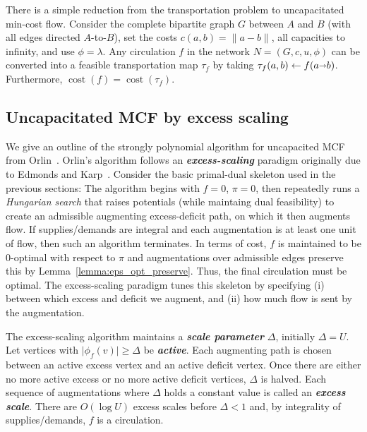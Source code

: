 \documentclass[a4paper,UKenglish]{socg-lipics-v2018}
\def\abs#1{\mathopen| #1 \mathclose|}		%
\def\norm#1{\mathopen\| #1 \mathclose\|}	%
\def\tsupply{\lambda}
\def\fsupply{\phi}
\def\arcto{\mathord\shortrightarrow}
\def\arc#1#2{#1\arcto#2}
\def\cost{\operatorname{cost}}
\theoremstyle{plain}
\numberwithin{figure}{section}
\def\EMPH#1{\textbf{\emph{\boldmath #1}}}
\begin{document}
There is a simple reduction from the transportation problem to uncapacitated
min-cost flow.
Consider the complete bipartite graph $G$ between $A$ and $B$ (with all edges
directed $A$-to-$B$), set the costs $c(a, b) = \norm{a-b}$, all capacities to
infinity, and use $\fsupply = \tsupply$.
Any circulation $f$ in the network $N = (G, c, u, \fsupply)$ can be converted
into a feasible transportation map $\tau_f$ by taking
$\tau_f(a, b) \gets f(\arc ab)$.
Furthermore, $\cost(f) = \cost(\tau_f)$.

\subsection{Uncapacitated MCF by excess scaling}

We give an outline of the strongly polynomial algorithm for uncapacited MCF
from Orlin~\cite{O93}.
Orlin's algorithm follows an \EMPH{excess-scaling} paradigm originally due to
Edmonds and Karp~\cite{EK72}.
Consider the basic primal-dual skeleton used in the previous sections:
The algorithm begins with $f = 0$, $\pi = 0$, then repeatedly runs a
\emph{Hungarian search} that raises potentials (while maintaing dual
feasibility) to create an admissible augmenting excess-deficit path, on which
it then augments flow.
If supplies/demands are integral and each augmentation is at least one unit of
flow, then such an algorithm terminates.
In terms of cost, $f$ is maintained to be $0$-optimal with respect to $\pi$
and augmentations over admissible edges preserve this by
Lemma~\ref{lemma:eps_opt_preserve}.
Thus, the final circulation must be optimal.
The excess-scaling paradigm tunes this skeleton by specifying (i) between which
excess and deficit we augment, and (ii) how much flow is sent by the
augmentation.

The excess-scaling algorithm maintains a \EMPH{scale parameter} $\Delta$,
initially $\Delta = U$.
Let vertices with $\abs{\fsupply_f(v)} \geq \Delta$ be \EMPH{active}.
Each augmenting path is chosen between an active excess vertex and an active
deficit vertex.
Once there are either no more active excess or no more active deficit vertices,
$\Delta$ is halved.
Each sequence of augmentations where $\Delta$ holds a constant value is called
an \EMPH{excess scale}.
There are $O(\log U)$ excess scales before $\Delta < 1$ and, by integrality of
supplies/demands, $f$ is a circulation.
\end{document}
